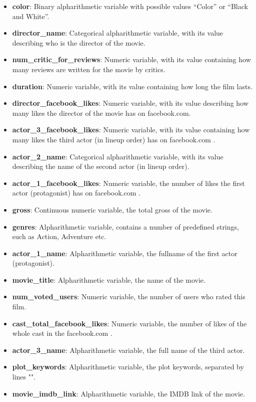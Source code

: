 \documentclass[letterpaper,twocolumn,10pt]{article}
\begin{document}
\begin{itemize}
\item \textbf{color}: Binary alpharithmetic variable with possible values “Color” or “Black and White”.
\item \textbf{director\_name}: Categorical alpharithmetic variable, with its value describing who is the director of the movie.
\item \textbf{num\_critic\_for\_reviews}: Numeric variable, with its value containing how many reviews are written for the movie by critics.
\item \textbf{duration}: Numeric variable, with its value containing how long the film lasts.
\item \textbf{director\_facebook\_likes}: Numeric variable, with its value describing how many likes the director of the movie has on facebook.com.
\item \textbf{actor\_3\_facebook\_likes}: Numeric variable, with its value containing how many likes the third actor (in lineup order) has on facebook.com .
\item \textbf{actor\_2\_name}: Categorical alpharithmetic variable, with its value describing the name of the second actor (in lineup order).
\item \textbf{actor\_1\_facebook\_likes}: Numeric variable, the number of likes the first actor (protagonist) has on facebook.com .
\item \textbf{gross}: Continuous numeric variable, the total gross of the movie.
\item \textbf{genres}: Alpharithmetic variable, contains a number of predefined strings, such as Action, Adventure etc.
\item \textbf{actor\_1\_name}: Alpharithmetic variable, the fullname of the first actor (protagonist).
\item \textbf{movie\_title}: Alpharithmetic variable, the name of the movie.
\item \textbf{num\_voted\_users}: Numeric variable, the number of users who rated this film.
\item \textbf{cast\_total\_facebook\_likes}: Numeric variable, the number of likes of the whole cast in the facebook.com .
\item \textbf{actor\_3\_name}: Alpharithmetic variable, the full name of the third actor.
\item \textbf{plot\_keywords}: Alpharithmetic variable, the plot keywords, separated by lines "\textbar".
\item \textbf{movie\_imdb\_link}: Alpharithmetic variable, the IMDB link of the movie. 

\end{itemize}
\end{document}
